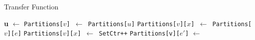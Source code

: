 \begin{algorithm}
    \caption{Transfer Function}
    \label{alg:TransferFunction}
    \begin{algorithmic}
            \State \textbf{u} $\gets$ 
            \State \texttt{Partitions[$v$] $\gets$ Partitions[$u$]}
            \State {}
                \State \texttt{Partitions[$v$][$x$] $\gets$ Partitions[$v$][$e$]}
            \Else 
                \State \texttt{Partitions[$v$][$x$] $\gets$ SetCtr++}
            \EndIf
            \State {}
                \State \texttt{Partitions[v][$e'$]} $\gets$ 
            \EndFor
        \EndProcedure
    \end{algorithmic}
\end{algorithm}

